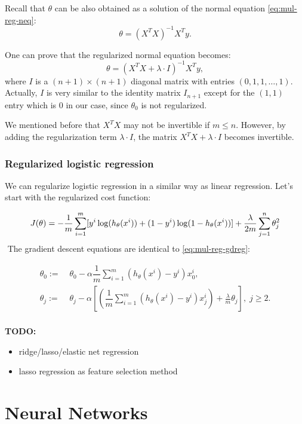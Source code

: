 \documentclass[a4paper,11pt]{report}
\begin{document}
Recall that $\theta$ can be also obtained as a solution of the normal equation \eqref{eq:mul-reg-neq}: $$\theta = (X^TX)^{-1}X^Ty.$$

One can prove that the regularized normal equation becomes: $$\theta = (X^TX +\lambda \cdot I)^{-1}X^Ty,$$
where $I$ is a $(n+1)\times (n+1)$ diagonal matrix with entries $(0,1,1,\ldots, 1)$. Actually, $I$ is very similar to the identity matrix $I_{n+1}$ except for the $(1,1)$ entry which is 0 in our case, since $\theta_0$ is not regularized.

We mentioned before that $X^TX$ may not be invertible if $m \leq n$. However, by adding the regularization term $\lambda\cdot I$, the matrix $X^TX +\lambda\cdot I$ becomes invertible.

\subsection*{Regularized logistic regression}

We can regularize logistic regression in a similar way as linear regression. Let's start with the regularized cost function:

\begin{equation}\label{eq:log-reg-costreg}
J(\theta) = - \dfrac{1}{m} \sum_{i=1}^m [ y^{i}\log (h_\theta (x^{i})) + (1 - y^{i}) \log (1 - h_\theta(x^{i}))\large] + \frac{\lambda}{2m}\sum_{j=1}^n \theta_j^2
\end{equation}
​	
The gradient descent equations are identical to \eqref{eq:mul-reg-gdreg}:

\begin{equation*}
\begin{split}
\theta_0 := & \; \theta_0 - \alpha \dfrac{1}{m} \sum_{i=1}^m (h_\theta(x^{i}) - y^{i})x_0^{i}, \\
\theta_j := & \; \theta_j - \alpha \left[ \left( \dfrac{1}{m}\sum_{i=1}^m (h_\theta(x^{i}) - y^{i})x_j^{i} \right) + \frac{\lambda}{m}\theta_j \right], \; j\geq 2. \\
\end{split}
\end{equation*}

\textbf{TODO:}
\begin{itemize}
  \item ridge/lasso/elastic net regression
  \item lasso regression as feature selection method
\end{itemize}


\chapter{Neural Networks}
\end{document}
